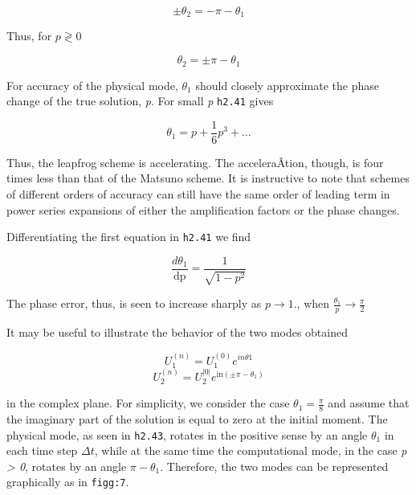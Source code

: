 \[\pm \theta_{2} = - \pi - \theta_{1}\]

Thus, for \(p \gtrless 0\)

\[\theta_{2} = \pm \pi - \theta_{1}\]

For accuracy of the physical mode, \(\theta_{1}\) should closely
approximate the phase change of the true solution, \emph{p}. For small
\emph{p} \texttt{h2.41} gives

\[\theta_{1} = p + \frac{1}{6}p^{3} + \ldots\]

Thus, the leapfrog scheme is accelerating. The acceleraÂ­tion, though, is
four times less than that of the Matsuno scheme. It is instructive to
note that schemes of different orders of accuracy can still have the
same order of leading term in power series expansions of either the
amplification factors or the phase changes.

Differentiating the first equation in \texttt{h2.41} we find

\[\frac{d\theta_{1}}{\text{dp}} = \frac{1}{\sqrt{1 - p^{2}}}\]

The phase error, thus, is seen to increase sharply as
\(p \rightarrow 1.\), when
\(\frac{\theta_{1}}{p} \rightarrow \frac{\pi}{2}\)

It may be useful to illustrate the behavior of the two modes obtained

\[U_{1}^{\left( n \right)} = U_{1}^{\left( 0 \right)}e^{in\theta 1}\]\[U_{2}^{\left( n \right)} = U_{2}^{\left| 0 \right|}e^{\text{in}\left( \pm \pi - \theta_{1} \right)}\]

in the complex plane. For simplicity, we consider the case
\(\theta_{1} = \frac{\pi}{8}\) and assume that the imaginary part of the
solution is equal to zero at the initial moment. The physical mode, as
seen in \texttt{h2.43}, rotates in the positive sense by an angle
\(\theta_{1}\) in each time step \(\Delta t\), while at the same time
the computational mode, in the case \emph{p \textgreater{} 0}, rotates
by an angle \(\pi - \theta_{1}\). Therefore, the two modes can be
represented graphically as in \texttt{figg:7}.

